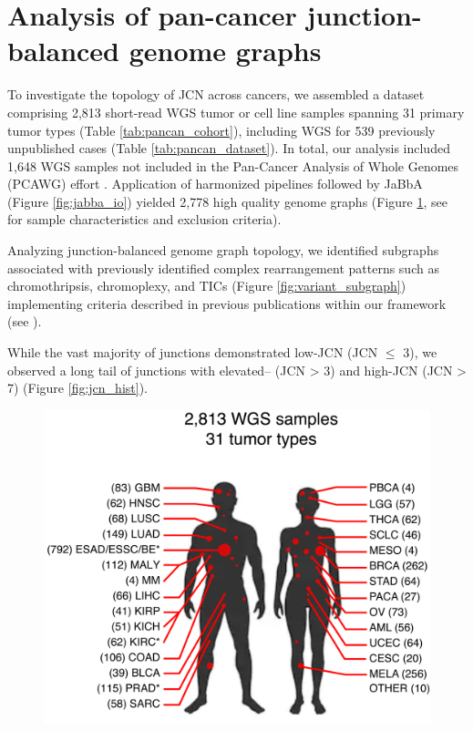 \documentclass[phd,tocprelim]{cornell}
\renewcommand{\caption}[1]{\singlespacing\hangcaption{#1}\normalspacing}
\begin{document}
\section{Analysis of pan-cancer junction-balanced genome graphs}
To investigate the topology of JCN across cancers, we assembled a dataset comprising 2,813 short-read WGS tumor or cell line samples spanning 31 primary tumor types (Table \ref{tab:pancan_cohort}), including WGS for 539 previously unpublished cases  (Table \ref{tab:pancan_dataset}). In total, our analysis included 1,648 WGS samples not included in the Pan-Cancer Analysis of Whole Genomes (PCAWG) effort \cite{pcawg_marker2020-yi}. Application of harmonized pipelines followed by JaBbA (Figure \ref{fig:jabba_io}) yielded 2,778 high quality genome graphs (Figure \ref{fig:pancancer}, see  for sample characteristics and exclusion criteria).

Analyzing junction-balanced genome graph topology, we identified subgraphs associated with previously identified complex rearrangement patterns such as chromothripsis, chromoplexy, and TICs (Figure \ref{fig:variant_subgraph}) implementing criteria described in previous publications within our framework (see ). 

While the vast majority of junctions demonstrated low-JCN (JCN $\le$ 3), we observed a long tail of junctions with elevated– (JCN > 3) and high-JCN (JCN > 7) (Figure \ref{fig:jcn_hist}).


\begin{figure}[!t]
    \centering
    \includegraphics[width=0.95\linewidth]{figures/600ppi/pancancer.png}
    \caption{\textbf{Pan-cancer WGS tumor types.}}
    \label{fig:pancancer}
\end{figure}
\end{document}
